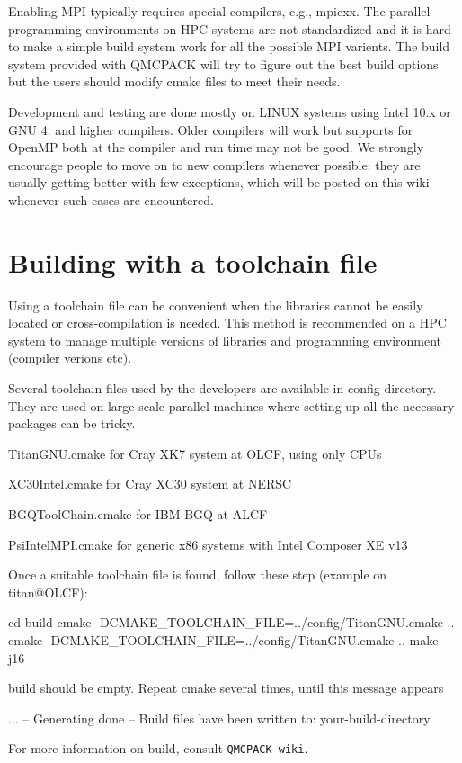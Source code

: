 Enabling M\-P\-I typically requires special compilers, e.\-g., {\ttfamily mpicxx}. The parallel programming environments on H\-P\-C systems are not standardized and it is hard to make a simple build system work for all the possible M\-P\-I varients. The build system provided with Q\-M\-C\-P\-A\-C\-K will try to figure out the best build options but the users should modify cmake files to meet their needs.

Development and testing are done mostly on L\-I\-N\-U\-X systems using Intel 10.\-x or G\-N\-U 4. and higher compilers. Older compilers will work but supports for Open\-M\-P both at the compiler and run time may not be good. We strongly encourage people to move on to new compilers whenever possible\-: they are usually getting better with few exceptions, which will be posted on this wiki whenever such cases are encountered.\section{Building with a toolchain file}\label{a00002_toolbuild}
Using a toolchain file can be convenient when the libraries cannot be easily located or cross-\/compilation is needed. This method is recommended on a H\-P\-C system to manage multiple versions of libraries and programming environment (compiler verions etc).

Several toolchain files used by the developers are available in {\ttfamily config} directory. They are used on large-\/scale parallel machines where setting up all the necessary packages can be tricky.
\begin{DoxyItemize}
\item {\ttfamily Titan\-G\-N\-U.\-cmake} for Cray X\-K7 system at O\-L\-C\-F, using only C\-P\-Us
\item {\ttfamily X\-C30\-Intel.\-cmake} for Cray X\-C30 system at N\-E\-R\-S\-C
\item {\ttfamily B\-G\-Q\-Tool\-Chain.\-cmake} for I\-B\-M B\-G\-Q at A\-L\-C\-F
\item {\ttfamily Psi\-Intel\-M\-P\-I.\-cmake} for generic x86 systems with Intel Composer X\-E v13
\end{DoxyItemize}

Once a suitable toolchain file is found, follow these step (example on titan@O\-L\-C\-F)\-: 
\begin{DoxyCode}
cd build
cmake -DCMAKE\_TOOLCHAIN\_FILE=../config/TitanGNU.cmake ..
cmake -DCMAKE\_TOOLCHAIN\_FILE=../config/TitanGNU.cmake ..
make -j16
\end{DoxyCode}
 {\ttfamily build} should be empty. Repeat {\ttfamily cmake} several times, until this message appears 
\begin{DoxyCode}
...
-- Generating done
-- Build files have been written to: your-build-directory
\end{DoxyCode}


For more information on build, consult {\tt Q\-M\-C\-P\-A\-C\-K wiki}. 